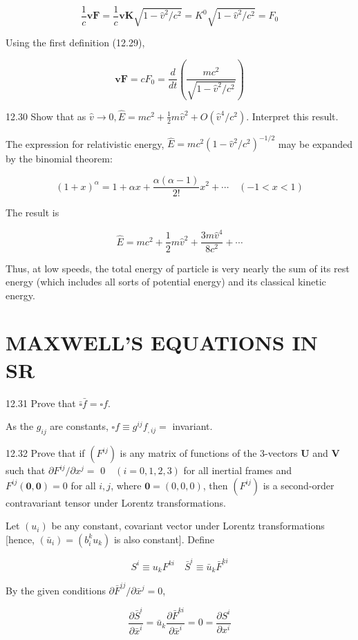 \documentclass[10pt]{article}
\begin{document}
$$
\frac{1}{c} \mathbf{v F}=\frac{1}{c} \mathbf{v K} \sqrt{1-\hat{v}^{2} / c^{2}}=K^{0} \sqrt{1-\hat{v}^{2} / c^{2}}=F_{0}
$$

Using the first definition (12.29),

$$
\mathbf{v F}=c F_{0}=\frac{d}{d t}\left(\frac{m c^{2}}{\sqrt{1-\hat{v}^{2} / c^{2}}}\right)
$$

12.30 Show that as $\hat{v} \rightarrow 0, \hat{E}=m c^{2}+\frac{1}{2} m \hat{v}^{2}+O\left(\hat{v}^{4} / c^{2}\right)$. Interpret this result.

The expression for relativistic energy, $\hat{E}=m c^{2}\left(1-\hat{v}^{2} / c^{2}\right)^{-1 / 2}$ may be expanded by the binomial theorem:

$$
(1+x)^{\alpha}=1+\alpha x+\frac{\alpha(\alpha-1)}{2 !} x^{2}+\cdots \quad(-1<x<1)
$$

The result is

$$
\hat{E}=m c^{2}+\frac{1}{2} m \hat{v}^{2}+\frac{3 m \hat{v}^{4}}{8 c^{2}}+\cdots
$$

Thus, at low speeds, the total energy of particle is very nearly the sum of its rest energy (which includes all sorts of potential energy) and its classical kinetic energy.

\section*{MAXWELL'S EQUATIONS IN SR}
12.31 Prove that $\bar{\square} \bar{f}=\square f$.

As the $g_{i j}$ are constants, $\square f \equiv g^{i j} f_{, i j}=$ invariant.

12.32 Prove that if $\left(F^{i j}\right)$ is any matrix of functions of the 3-vectors $\mathbf{U}$ and $\mathbf{V}$ such that $\partial F^{i j} / \partial x^{j}=$ $0 \quad(i=0,1,2,3)$ for all inertial frames and $F^{i j}(\mathbf{0}, \mathbf{0})=0$ for all $i, j$, where $\mathbf{0}=(0,0,0)$, then $\left(F^{i j}\right)$ is a second-order contravariant tensor under Lorentz transformations.

Let $\left(u_{i}\right)$ be any constant, covariant vector under Lorentz transformations [hence, $\left(\bar{u}_{i}\right)=\left(b_{i}^{k} u_{k}\right)$ is also constant]. Define

$$
S^{i} \equiv u_{k} F^{k i} \quad \bar{S}^{i} \equiv \bar{u}_{k} \bar{F}^{k i}
$$

By the given conditions $\partial \bar{F}^{i j} / \partial \bar{x}^{j}=0$,

$$
\frac{\partial \bar{S}^{i}}{\partial \bar{x}^{i}}=\bar{u}_{k} \frac{\partial \bar{F}^{k i}}{\partial \bar{x}^{i}}=0=\frac{\partial S^{i}}{\partial x^{i}}
$$
\end{document}
